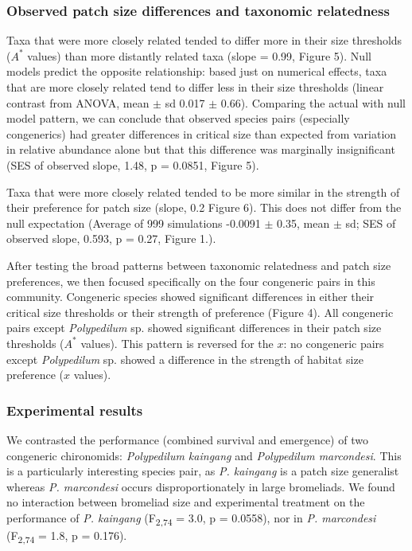 \subsubsection{Observed patch size differences and taxonomic
relatedness}\label{observed-habitat-size-differences-and-taxonomic-relatedness}

Taxa that were more closely related tended to differ more in their size
thresholds (\(A^{*}\) values) than more distantly related taxa (slope =
0.99, Figure 5). Null models predict the opposite relationship: based
just on numerical effects, taxa that are more closely related tend to
differ less in their size thresholds (linear contrast from ANOVA, mean $\pm$
sd 0.017 $\pm$ 0.66). Comparing the actual with null model pattern, we can
conclude that observed species pairs (especially congenerics) had
greater differences in critical size than expected from variation in
relative abundance alone but that this difference was marginally
insignificant (SES of observed slope, 1.48, p = 0.0851, Figure 5).

Taxa that were more closely related tended to be more similar in the
strength of their preference for patch size (slope, 0.2 Figure 6).
This does not differ from the null expectation (Average of 999
simulations -0.0091 $\pm$ 0.35, mean $\pm$ sd; SES of observed slope, 0.593, p =
0.27, Figure 1.).

After testing the broad patterns between taxonomic relatedness and
patch size preferences, we then focused specifically on the four
congeneric pairs in this community. Congeneric species showed
significant differences in either their critical size thresholds or
their strength of preference (Figure 4). All congeneric pairs except
\emph{Polypedilum} sp. showed significant differences in their patch
size thresholds (\(A^{*}\) values). This pattern is reversed for the
$x$: no congeneric pairs except
\emph{Polypedilum} sp. showed a difference in the strength of habitat
size preference (\(x\) values).

\subsubsection{Experimental results}\label{experimental-results}

We contrasted the performance (combined survival and emergence) of two
congeneric chironomids: \emph{Polypedilum kaingang} and
\emph{Polypedilum marcondesi}. This is a particularly interesting
species pair, as \emph{P. kaingang} is a patch size generalist whereas
\emph{P. marcondesi} occurs disproportionately in large bromeliads. We
found no interaction between bromeliad size and experimental treatment
on the performance of \emph{P. kaingang} (F\textsubscript{2,74} = 3.0, p
= 0.0558), nor in \emph{P. marcondesi} (F\textsubscript{2,74} = 1.8, p =
0.176).

